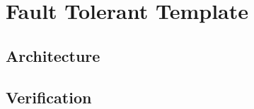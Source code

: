\chapter{Fault Tolerant Template}{
	
	
	\section{Architecture}{
		
	
	}%
	\section{Verification}{
	
	}%
}